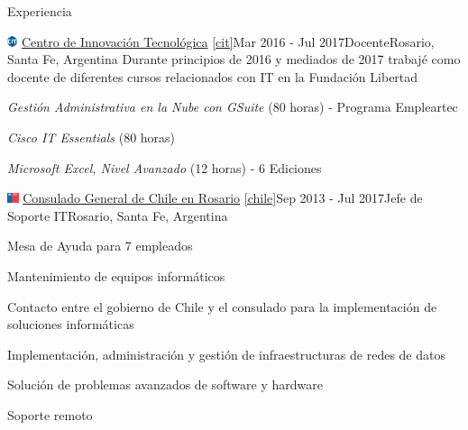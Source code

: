 \documentclass{resume} %
\begin{document}
\begin{rSection}{Experiencia}

    \begin{rSubsection}{\includegraphics[height=0.3cm]{images/cit.png} \href{https://www.centroit.org.ar/}{Centro de Innovación Tecnológica} \ref{cit}}{Mar 2016 - Jul 2017}{Docente}{Rosario, Santa Fe, Argentina}
        Durante principios de 2016 y mediados de 2017 trabajé como docente de diferentes cursos relacionados con IT en la Fundación Libertad
        \item \textit{Gestión Administrativa en la Nube con GSuite} (80 horas) - Programa Empleartec
        \item \textit{Cisco IT Essentials} (80 horas)
        \item \textit{Microsoft Excel, Nivel Avanzado} (12 horas) - 6 Ediciones
    \end{rSubsection}


    \begin{rSubsection}{\includegraphics[height=0.3cm]{images/minrel-chile.png} \href{https://chile.gob.cl/rosario/}{Consulado General de Chile en Rosario} \ref{chile}}{Sep 2013 - Jul 2017}{Jefe de Soporte IT}{Rosario, Santa Fe, Argentina}

        \item Mesa de Ayuda para 7 empleados
        \item Mantenimiento de equipos informáticos
        \item Contacto entre el gobierno de Chile y el consulado para la implementación de soluciones informáticas
        \item Implementación, administración y gestión de infraestructuras de redes de datos
        \item Solución de problemas avanzados de software y hardware
        \item Soporte remoto
    \end{rSubsection}



\end{rSection}
\end{document}
